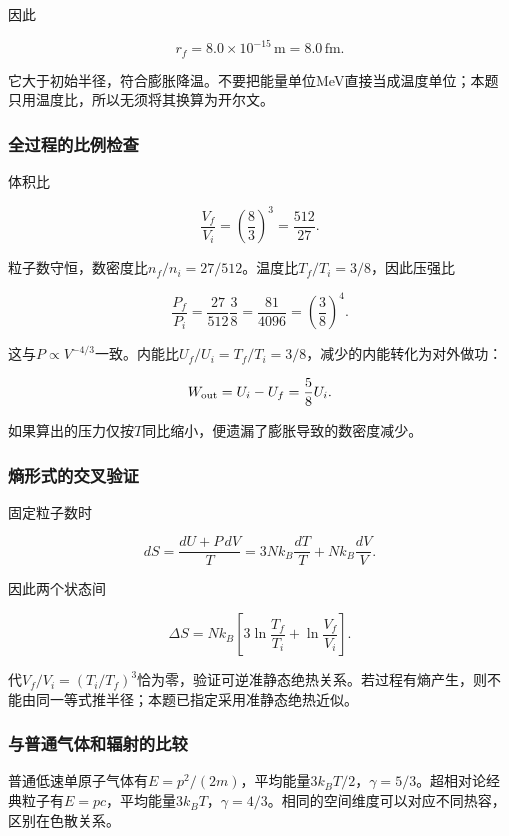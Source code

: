 \documentclass[12pt,a4paper,fontset=fandol]{ctexart}
\begin{document}
因此

\[
\boxed{r_f=8.0\times10^{-15}\,\mathrm m=8.0\,\mathrm{fm}}.
\]

它大于初始半径，符合膨胀降温。不要把能量单位MeV直接当成温度单位；本题只用温度比，所以无须将其换算为开尔文。

\subsubsection{全过程的比例检查}\label{ux5168ux8fc7ux7a0bux7684ux6bd4ux4f8bux68c0ux67e5}

体积比

\[
\frac{V_f}{V_i}=\left(\frac83\right)^3=\frac{512}{27}.
\]

粒子数守恒，数密度比\(n_f/n_i=27/512\)。温度比\(T_f/T_i=3/8\)，因此压强比

\[
\frac{P_f}{P_i}=\frac{27}{512}\frac38
=\frac{81}{4096}=\left(\frac38\right)^4.
\]

这与\(P\propto V^{-4/3}\)一致。内能比\(U_f/U_i=T_f/T_i=3/8\)，减少的内能转化为对外做功：

\[
W_{\rm out}=U_i-U_f=\frac58U_i.
\]

如果算出的压力仅按\(T\)同比缩小，便遗漏了膨胀导致的数密度减少。

\subsubsection{熵形式的交叉验证}\label{ux71b5ux5f62ux5f0fux7684ux4ea4ux53c9ux9a8cux8bc1}

固定粒子数时

\[
dS=\frac{dU+P\,dV}{T}
=3Nk_B\frac{dT}{T}+Nk_B\frac{dV}{V}.
\]

因此两个状态间

\[
\Delta S=Nk_B\left[3\ln\frac{T_f}{T_i}
+\ln\frac{V_f}{V_i}\right].
\]

代\(V_f/V_i=(T_i/T_f)^3\)恰为零，验证可逆准静态绝热关系。若过程有熵产生，则不能由同一等式推半径；本题已指定采用准静态绝热近似。

\subsubsection{与普通气体和辐射的比较}\label{ux4e0eux666eux901aux6c14ux4f53ux548cux8f90ux5c04ux7684ux6bd4ux8f83}

普通低速单原子气体有\(E=p^2/(2m)\)，平均能量\(3k_BT/2\)，\(\gamma=5/3\)。超相对论经典粒子有\(E=pc\)，平均能量\(3k_BT\)，\(\gamma=4/3\)。相同的空间维度可以对应不同热容，区别在色散关系。
\end{document}
